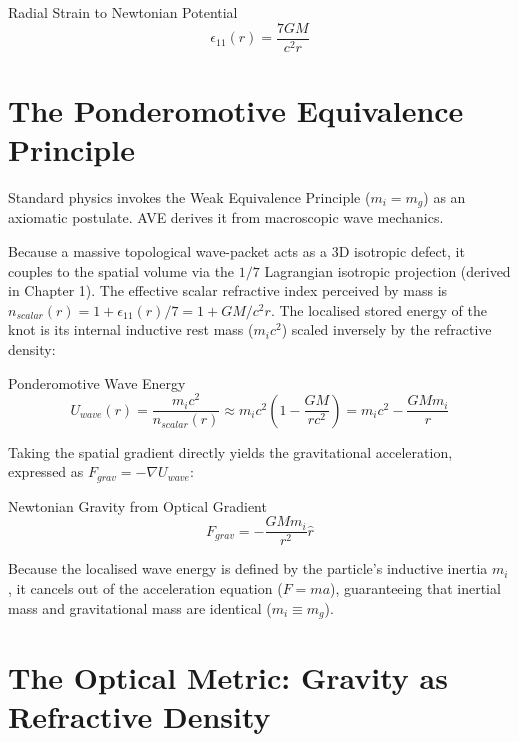 \begin{resultbox}{Radial Strain to Newtonian Potential}
\begin{equation}
\epsilon_{11}(r)=\frac{7GM}{c^{2}r}
\end{equation}
\end{resultbox}

\section{The Ponderomotive Equivalence Principle}

Standard physics invokes the Weak Equivalence Principle ($m_i=m_g$) as an axiomatic postulate. AVE derives it from macroscopic wave mechanics.

Because a massive topological wave-packet acts as a 3D isotropic defect, it couples to the spatial volume via the $1/7$ Lagrangian isotropic projection (derived in Chapter 1). The effective scalar refractive index perceived by mass is $n_{scalar}(r)=1+\epsilon_{11}(r)/7=1+GM/c^{2}r$. The localised stored energy of the knot is its internal inductive rest mass ($m_i c^{2}$) scaled inversely by the refractive density:

\begin{resultbox}{Ponderomotive Wave Energy}
\begin{equation}
U_{wave}(r)=\frac{m_i c^{2}}{n_{scalar}(r)}\approx m_i c^{2}\left(1-\frac{GM}{rc^{2}}\right)=m_i c^{2}-\frac{GM m_i}{r}
\end{equation}
\end{resultbox}

Taking the spatial gradient directly yields the gravitational acceleration, expressed as $F_{grav}=-\nabla U_{wave}$:

\begin{resultbox}{Newtonian Gravity from Optical Gradient}
\begin{equation}
F_{grav}=-\frac{GM m_i}{r^{2}}\hat{r}
\end{equation}
\end{resultbox}

Because the localised wave energy is defined by the particle's inductive inertia $m_i$, it cancels out of the acceleration equation ($F=ma$), guaranteeing that inertial mass and gravitational mass are identical ($m_i\equiv m_g$).

\section{The Optical Metric: Gravity as Refractive Density}
\label{sec:optical_metric}

